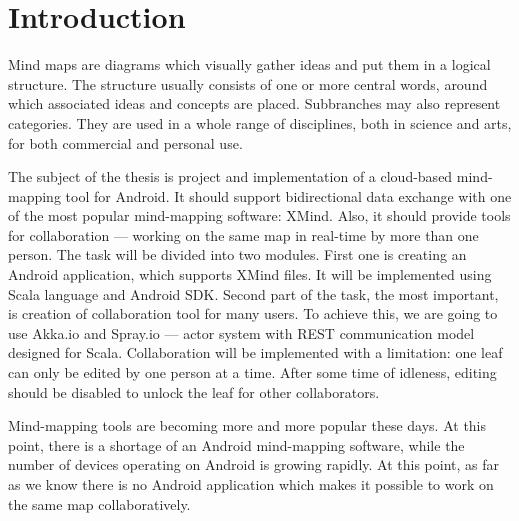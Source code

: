 %
%
%
%
%

\chapter{Introduction}
\label{chap:introduction}


Mind maps are diagrams which visually gather ideas and put them in a logical structure. The structure usually consists of one or more central words, around which associated ideas and concepts are placed. Subbranches may also represent categories. They are used in a whole range of disciplines, both in science and arts, for both commercial and personal use\cite{Gee:2010:Roots}.


The subject of the thesis is project and implementation of a cloud-based mind-mapping tool for Android. It should support bidirectional data exchange with one of the most popular mind-mapping software: XMind. Also, it should provide tools for collaboration --- working on the same map in real-time by more than one person. The task will be divided into two modules. First one is creating an Android application, which supports XMind files. It will be implemented using Scala language and Android SDK. Second part of the task, the most important, is creation of collaboration tool for many users. To achieve this, we are going to use Akka.io and Spray.io --- actor system with REST communication model designed for Scala. Collaboration will be implemented with a limitation: one leaf can only be edited by one person at a time. After some time of idleness, editing should be disabled to unlock the leaf for other collaborators.


Mind-mapping tools are becoming more and more popular these days. At this point, there is a shortage of an Android mind-mapping software, while the number of devices operating on Android is growing rapidly. At this point, as far as we know there is no Android application which makes it possible to work on the same map collaboratively.

